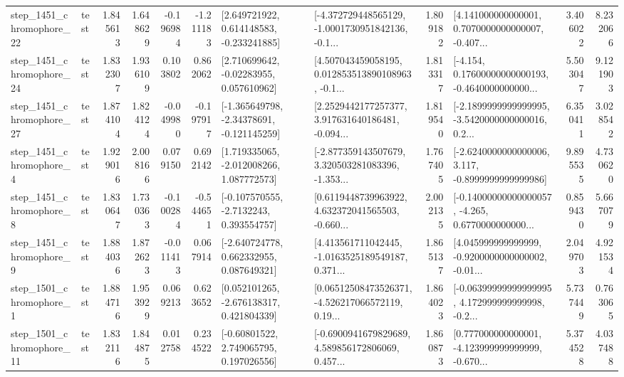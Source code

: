 \begin{tabular}{llrrrrllrlrr}
 step\_1451\_chromophore\_22 &      test &      1.845613 &    1.648629 &     -0.196984 & -1.211183 &    [2.649721922, 0.614148583, -0.233241885] &  [-4.372729448565129, -1.0001730951842136, -0.1... &       1.809182 &  [4.141000000000001, 0.7070000000000007, -0.407... &            3.406022 &          8.232066 \\
 step\_1451\_chromophore\_24 &      test &      1.832307 &    1.936109 &      0.103802 &  0.862062 &     [2.710699642, -0.02283955, 0.057610962] &  [4.507043459058195, 0.012853513890108963, -0.1... &       1.813317 &  [-4.154, 0.17600000000000193, -0.4640000000000... &            5.503047 &          9.121903 \\
 step\_1451\_chromophore\_27 &      test &      1.874104 &    1.824124 &     -0.049980 & -0.197917 &   [-1.365649798, -2.34378691, -0.121145259] &  [2.2529442177257377, 3.917631640186481, -0.094... &       1.819540 &  [-2.1899999999999995, -3.5420000000000016, 0.2... &            6.350411 &          3.028542 \\
  step\_1451\_chromophore\_4 &      test &      1.929016 &    2.008166 &      0.079150 &  0.692142 &    [1.719335065, -2.012008266, 1.087772573] &  [-2.877359143507679, 3.320503281083396, -1.353... &       1.767405 &  [-2.6240000000000006, 3.117, -0.8999999999999986] &            9.895535 &          4.730620 \\
  step\_1451\_chromophore\_8 &      test &      1.830647 &    1.730363 &     -0.100284 & -0.544651 &     [-0.107570555, -2.7132243, 0.393554757] &  [0.6119448739963922, 4.632372041565503, -0.660... &       2.002135 &  [-0.14000000000000057, -4.265, 0.6770000000000... &            0.859430 &          5.667079 \\
  step\_1451\_chromophore\_9 &      test &      1.884036 &    1.872623 &     -0.011413 &  0.067914 &    [-2.640724778, 0.662332955, 0.087649321] &  [4.413561711042445, -1.0163525189549187, 0.371... &       1.865137 &  [4.045999999999999, -0.9200000000000002, -0.01... &            2.049703 &          4.921534 \\
  step\_1501\_chromophore\_1 &      test &      1.884716 &    1.953929 &      0.069213 &  0.623652 &    [0.052101265, -2.676138317, 0.421804339] &  [0.06512508473526371, -4.526217066572119, 0.19... &       1.864023 &  [-0.06399999999999995, 4.172999999999998, -0.2... &            5.737449 &          0.763065 \\
 step\_1501\_chromophore\_11 &      test &      1.832116 &    1.844875 &      0.012758 &  0.234522 &     [-0.60801522, 2.749065795, 0.197026556] &  [-0.6900941679829689, 4.589856172806069, 0.457... &       1.860873 &  [0.777000000000001, -4.123999999999999, -0.670... &            5.374528 &          4.037488 \\

\end{tabular}
